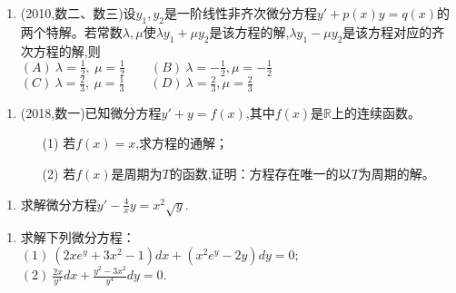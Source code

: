 \documentclass[12pt, a4paper, oneside, UTF8]{ctexbook}
\begin{document}
\begin{enumerate}[label=\arabic*.,start=4]
    \item (2010,数二、数三)设$y_1,y_2$是一阶线性非齐次微分方程$y'+p(x)y=q(x)$的两个特解。若常数$\lambda,\mu$使$\lambda y_1+\mu y_2$是该方程的解,$\lambda y_1-\mu y_2$是该方程对应的齐次方程的解,则 \\
    $(A)\ \lambda=\frac{1}{2},\ \mu=\frac{1}{2} \qquad (B)\ \lambda=-\frac{1}{2},\mu=-\frac{1}{2}$ \\
    $(C)\ \lambda=\frac{2}{3},\ \mu=\frac{1}{3}\qquad (D)\ \lambda=\frac{2}{3},\mu=\frac{2}{3}$ 

    
    \begin{solution}
    \newpage
    \end{solution}
\end{enumerate}

\begin{enumerate}[label=\arabic*.,start=5]
    \item (2018,数一)已知微分方程$y'+y=f(x)$,其中$f(x)$是$\mathbb{R}$上的连续函数。
    \begin{enumerate}[label=(\roman*)]
        \item[(1)] 若$f(x)=x$,求方程的通解；
        \item[(2)] 若$f(x)$是周期为$T$的函数,证明：方程存在唯一的以$T$为周期的解。
    \end{enumerate}
    
    \begin{solution}
    \newpage
    \end{solution}
\end{enumerate}


\begin{enumerate}[label=\arabic*.,start=6]
    \item 求解微分方程$y'-\frac{4}{x}y=x^2\sqrt{y}$.
    
    \begin{solution}
    \newpage
    \end{solution}
\end{enumerate}

\begin{enumerate}[label=\arabic*.,start=7]
    \item 求解下列微分方程：\\
        $(1)\ (2xe^y+3x^2-1)dx+(x^2e^y-2y)dy=0;$ \\
        $(2)\ \frac{2x}{y^3}dx+\frac{y^2-3x^2}{y^4}dy=0$.
    
    \begin{solution}
    \newpage
    \end{solution}
\end{enumerate}
\end{document}
